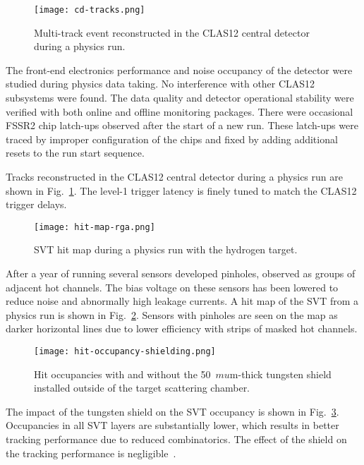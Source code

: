 \begin{figure}[hbt] 
\centering 
\texttt{[image: cd-tracks.png]}
\caption{Multi-track event reconstructed in the CLAS12 central detector during a physics run.}
\label{fig:cd-tracks}
\end{figure}

The front-end electronics performance and noise occupancy of the detector were studied during physics data taking. No interference with other CLAS12 subsystems were found. The data quality and detector operational stability  were verified with both online and offline monitoring packages. There were occasional FSSR2 chip latch-ups observed after the start of a new run. These latch-ups were traced by improper configuration of the chips and fixed by adding additional resets to the run start sequence.

Tracks reconstructed in the CLAS12 central detector during a physics run are shown in Fig.~\ref{fig:cd-tracks}. The level-1 trigger latency is finely tuned to match the CLAS12 trigger delays.

\begin{figure}[hbt] 
\centering 
\texttt{[image: hit-map-rga.png]}
\caption{SVT hit map during a physics run with the hydrogen target.}
\label{fig:hit-map-rga}
\end{figure}

After a year of running several sensors developed pinholes, observed as groups of adjacent hot channels. The bias voltage on these sensors has been lowered to reduce noise and abnormally high leakage currents. A hit map of the SVT from a physics run is shown in Fig.~\ref{fig:hit-map-rga}. Sensors with pinholes are seen on the map as darker horizontal lines due to lower efficiency with strips of masked hot channels. 

\begin{figure}[hbt] 
\centering 
\texttt{[image: hit-occupancy-shielding.png]}
\caption{Hit occupancies with and without the 50~$mu$m-thick tungsten shield installed outside of the target scattering chamber.}
\label{fig:hit-occupancy-shielding}
\end{figure}

The impact of the tungsten shield on the SVT occupancy is shown in Fig.~\ref{fig:hit-occupancy-shielding}. Occupancies in all SVT layers are substantially lower, which results in better tracking performance due to reduced combinatorics. The effect of the shield on the tracking performance is negligible~\cite{SHIELDNOTE}.


